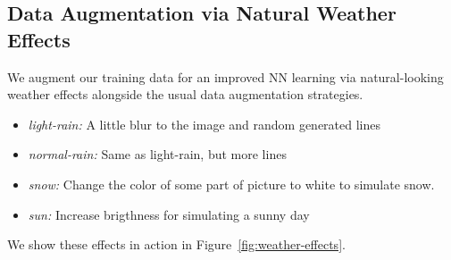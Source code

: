\subsection{Data Augmentation via Natural Weather Effects}
We augment our training data for an improved NN learning via natural-looking
weather effects alongside the usual data augmentation strategies.
\begin{itemize}
    \item \emph{light-rain:} A little blur to the image and random generated lines
    \item \emph{normal-rain:} Same as light-rain, but more lines
    \item \emph{snow:} Change the color of some part of picture to white to simulate snow.
    \item \emph{sun:} Increase brigthness for simulating a sunny day
\end{itemize}

We show these effects in action in Figure~\ref{fig:weather-effects}.

